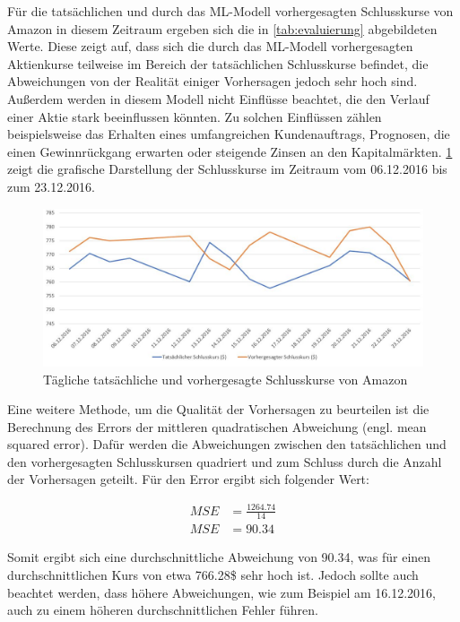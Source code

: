 Für die tatsächlichen und durch das ML-Modell vorhergesagten Schlusskurse von Amazon in diesem Zeitraum ergeben sich die in \cref{tab:evaluierung} abgebildeten Werte.
Diese zeigt auf, dass sich die durch das ML-Modell vorhergesagten Aktienkurse teilweise im Bereich der tatsächlichen Schlusskurse befindet, die Abweichungen von der Realität einiger Vorhersagen jedoch sehr hoch sind. Außerdem werden in diesem Modell nicht Einflüsse beachtet, die den Verlauf einer Aktie stark beeinflussen könnten. Zu solchen Einflüssen zählen beispielsweise das Erhalten eines umfangreichen Kundenauftrags, Prognosen, die einen Gewinnrückgang erwarten oder steigende Zinsen an den Kapitalmärkten. \cref{fig:chart} zeigt die grafische Darstellung der Schlusskurse im Zeitraum vom 06.12.2016 bis zum 23.12.2016.

\begin{figure}[H]
    \centering
    \includegraphics[scale=0.65]{images/Chart.jpg}
    \caption{Tägliche tatsächliche und vorhergesagte Schlusskurse von Amazon}
    \label{fig:chart}
\end{figure}

Eine weitere Methode, um die Qualität der Vorhersagen zu beurteilen ist die Berechnung des Errors der mittleren quadratischen Abweichung (engl. mean squared error). Dafür werden die Abweichungen zwischen den tatsächlichen und den vorhergesagten Schlusskursen quadriert und zum Schluss durch die Anzahl der Vorhersagen geteilt. Für den Error ergibt sich folgender Wert:

\begin{align*}
    MSE &= \frac{1264.74}{14} \\
    MSE &= 90.34
\end{align*}

Somit ergibt sich eine durchschnittliche Abweichung von 90.34, was für einen durchschnittlichen Kurs von etwa 766.28\$ sehr hoch ist. Jedoch sollte auch beachtet werden, dass höhere Abweichungen, wie zum Beispiel am 16.12.2016, auch zu einem höheren durchschnittlichen Fehler führen.

